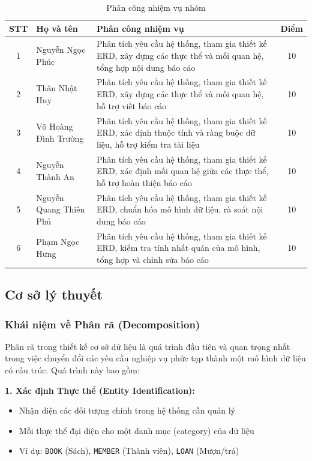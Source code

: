 \documentclass[12pt,a4paper]{article}
\newcommand{\entity}[1]{\texttt{#1}}
\begin{document}
\begin{table}[H]
\centering
\caption{Phân công nhiệm vụ nhóm}
\begin{tabular}{@{}|c|l|p{8cm}|c|@{}}
\hline
\textbf{STT} & \textbf{Họ và tên} & \textbf{Phân công nhiệm vụ} & \textbf{Điểm} \\ \hline
1 & Nguyễn Ngọc Phúc &
Phân tích yêu cầu hệ thống, tham gia thiết kế ERD, xây dựng các thực thể và mối quan hệ, tổng hợp nội dung báo cáo &
10 \\ \hline
2 & Thân Nhật Huy &
Phân tích yêu cầu hệ thống, tham gia thiết kế ERD, xây dựng các thực thể và mối quan hệ, hỗ trợ viết báo cáo &
10 \\ \hline
3 & Võ Hoàng Đình Trường &
Phân tích yêu cầu hệ thống, tham gia thiết kế ERD, xác định thuộc tính và ràng buộc dữ liệu, hỗ trợ kiểm tra tài liệu &
10 \\ \hline
4 & Nguyễn Thành An &
Phân tích yêu cầu hệ thống, tham gia thiết kế ERD, xác định mối quan hệ giữa các thực thể, hỗ trợ hoàn thiện báo cáo &
10 \\ \hline
5 & Nguyễn Quang Thiên Phú &
Phân tích yêu cầu hệ thống, tham gia thiết kế ERD, chuẩn hóa mô hình dữ liệu, rà soát nội dung báo cáo &
10 \\ \hline
6 & Phạm Ngọc Hưng &
Phân tích yêu cầu hệ thống, tham gia thiết kế ERD, kiểm tra tính nhất quán của mô hình, tổng hợp và chỉnh sửa báo cáo &
10 \\ \hline
\end{tabular}
\end{table}


\subsection{Cơ sở lý thuyết}

\subsubsection{Khái niệm về Phân rã (Decomposition)}

Phân rã trong thiết kế cơ sở dữ liệu là quá trình đầu tiên và quan trọng nhất trong việc chuyển đổi các yêu cầu nghiệp vụ phức tạp thành một mô hình dữ liệu có cấu trúc. Quá trình này bao gồm:

\textbf{1. Xác định Thực thể (Entity Identification):}
\begin{itemize}
    \item Nhận diện các đối tượng chính trong hệ thống cần quản lý
    \item Mỗi thực thể đại diện cho một danh mục (category) của dữ liệu
    \item Ví dụ: \entity{BOOK} (Sách), \entity{MEMBER} (Thành viên), \entity{LOAN} (Mượn/trả)
\end{itemize}
\end{document}
